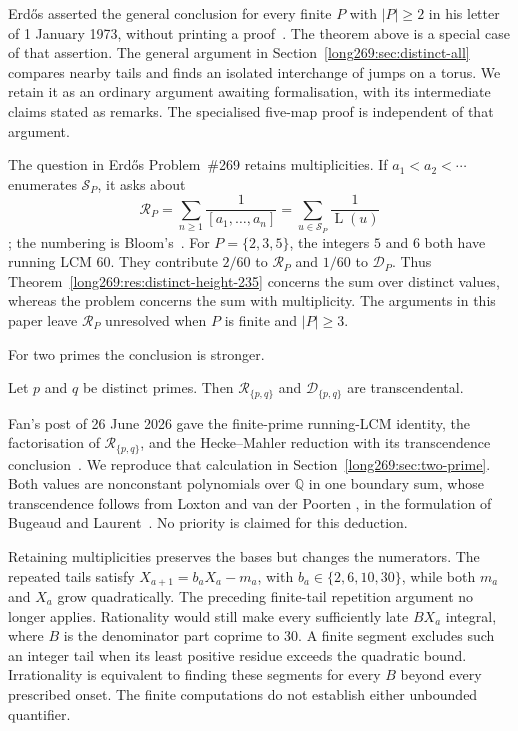 \documentclass[11pt]{article}
\theoremstyle{remark}
\theoremstyle{plain}
\newcommand{\Lprefix}{\operatorname{L}}
\begin{document}
Erd\H{o}s asserted the general conclusion for every finite $P$ with
$|P|\ge2$ in his letter of 1 January 1973, without printing a
proof~\cite[p.~335]{erdos1974letter}. The theorem above is a special case
of that assertion. The general argument in
Section~\ref{long269:sec:distinct-all} compares nearby tails and finds an
isolated interchange of jumps on a torus. We retain it as an ordinary
argument awaiting formalisation, with its intermediate claims stated as
remarks. The specialised five-map proof is independent of that argument.

The question in Erd\H{o}s Problem~\#269 retains multiplicities. If
$a_1<a_2<\cdots$ enumerates $\mathcal S_P$, it asks about
\[
 \mathcal R_P=\sum_{n\ge1}\frac1{[a_1,\ldots,a_n]}
             =\sum_{u\in\mathcal S_P}\frac1{\Lprefix(u)}
\]
\cite[p.~65]{erdosgraham1980}\cite[p.~106]{erdos1988}; the numbering is
Bloom's~\cite{erdosproblems}. For $P=\{2,3,5\}$, the integers $5$ and $6$
both have running LCM $60$. They contribute $2/60$ to $\mathcal R_P$ and
$1/60$ to $\mathcal D_P$. Thus Theorem~\ref{long269:res:distinct-height-235}
concerns the sum over distinct values, whereas the problem concerns
the sum with multiplicity. The arguments in this paper leave
$\mathcal R_P$ unresolved when $P$ is finite and $|P|\ge3$.

For two primes the conclusion is stronger.

\begin{theorem}\label{long269:res:lead-two-prime}
Let $p$ and $q$ be distinct primes.  Then $\mathcal R_{\{p,q\}}$ and
$\mathcal D_{\{p,q\}}$ are transcendental.
\end{theorem}

Fan's post of 26 June 2026 gave the finite-prime running-LCM identity,
the factorisation of $\mathcal R_{\{p,q\}}$, and the Hecke--Mahler reduction
with its transcendence conclusion~\cite{fan2026comment}. We reproduce that
calculation in Section~\ref{long269:sec:two-prime}. Both values are
nonconstant polynomials over $\mathbb Q$ in one boundary sum, whose
transcendence follows from Loxton and van der Poorten
\cite[Theorem~8, p.~40]{loxtonvdp1977}, in the formulation of Bugeaud and
Laurent~\cite[Theorem~1.1]{bugeaudlaurent2023}. No priority is claimed for
this deduction.

Retaining multiplicities preserves the bases but changes the numerators.
The repeated tails satisfy $X_{a+1}=b_aX_a-m_a$, with
$b_a\in\{2,6,10,30\}$, while both $m_a$ and $X_a$ grow quadratically.
The preceding finite-tail repetition argument no longer applies. Rationality would
still make every sufficiently late $BX_a$ integral, where $B$ is the
denominator part coprime to $30$. A finite segment excludes such an
integer tail when its least positive residue exceeds the quadratic
bound. Irrationality is equivalent to finding these segments for every
$B$ beyond every prescribed onset. The finite computations do not
establish either unbounded quantifier.
\end{document}
